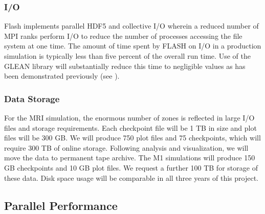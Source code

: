 \subsubsection{I/O}
Flash implements parallel HDF5 and collective I/O wherein a reduced
number of MPI ranks perform I/O to reduce the number of processes
accessing the file system at one time. The amount of time spent by
FLASH on I/O in a production simulation is typically less than five
percent of the overall run time. Use of the GLEAN library will
substantially reduce this time to negligible values as has been
demonstrated previously (see \citet{vishwanath2011}).

\subsubsection{Data Storage}
For the MRI simulation, the enormous number of zones is reflected
in large I/O files and storage requirements.  Each checkpoint file
will be 1 TB in size and plot files will be 300 GB.  We will produce
750 plot files and 75 checkpoints, which will require 300 TB of online
storage.  Following analysis and visualization, we will move the data
to permanent tape archive.
The M1 simulations will produce 150 GB checkpoints and 10 GB plot files.
We request a further 100 TB for storage of these data.
Disk space usage will be comparable in all three years of this project.






\subsection{Parallel Performance}
\label{sec:performance}


